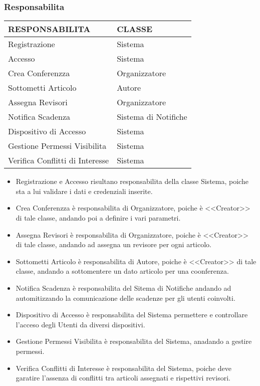 \subsubsection{Responsabilita}
\label{sec:responsabilita}
\begin{tabular}{|p{5cm}|p{5cm}|}
\hline 
 \rowcolor{SkyBlue}
RESPONSABILITA & CLASSE\\
\hline
Registrazione & Sistema\\
\hline
Accesso & Sistema\\
\hline
Crea Conferenzza & Organizzatore\\
\hline
Sottometti Articolo & Autore\\
\hline
Assegna Revisori & Organizzatore\\
\hline
Notifica Scadenza & Sistema di Notifiche\\
\hline
Dispositivo di Accesso & Sistema\\
\hline
Gestione Permessi Visibilita & Sistema\\
\hline
Verifica Conflitti di Interesse & Sistema\\
\hline
\end{tabular}

\begin{itemize}
\item Registrazione e Accesso risultano responsabilita della classe Sistema, poiche sta a lui validare i dati e credenziali inserite.\\
\item Crea Conferenzza è responsabilita di Organizzatore, poiche è <<Creator>> di tale classe, andando poi a definire i vari parametri.\\
\item Assegna Revisori è responsabilita di Organizzatore, poiche è <<Creator>> di tale classe, andando ad assegna un revisore per ogni articolo.\\
\item Sottometti Articolo è responsabilita di Autore, poiche è <<Creator>> di tale classe, andando a sottomentere un dato articolo per una coonferenza.\\
\item Notifica Scadenza è responsabilita del Sitema di Notifiche andando ad automitizzando la comunicazione delle scadenze per gli utenti coinvolti.\\
\item Dispositivo di Accesso è responsabilita del Sistema permettere e controllare l'acceso degli Utenti da diversi dispositivi.\\
\item Gestione Permessi Visibilita è responsabilita del Sistema, anadando a gestire permessi.\\
\item Verifica Conflitti di Interesse è responsabilita del Sistema, poiche deve garatire l'assenza di conflitti tra articoli assegnati e rispettivi revisori.\\
\end{itemize}

